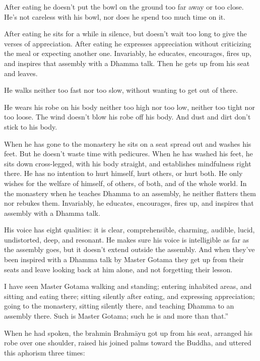 \documentclass[12pt,openany]{book}%
\begin{document}
After eating he doesn’t put the bowl on the ground too far away or too close. He’s not careless with his bowl, nor does he spend too much time on it. 

After eating he sits for a while in silence, but doesn’t wait too long to give the verses of appreciation. After eating he expresses appreciation without criticizing the meal or expecting another one. Invariably, he educates, encourages, fires up, and inspires that assembly with a Dhamma talk. Then he gets up from his seat and leaves. 

He walks neither too fast nor too slow, without wanting to get out of there. 

He wears his robe on his body neither too high nor too low, neither too tight nor too loose. The wind doesn’t blow his robe off his body. And dust and dirt don’t stick to his body. 

When he has gone to the monastery he sits on a seat spread out and washes his feet. But he doesn’t waste time with pedicures. When he has washed his feet, he sits down cross-legged, with his body straight, and establishes mindfulness right there. He has no intention to hurt himself, hurt others, or hurt both. He only wishes for the welfare of himself, of others, of both, and of the whole world. In the monastery when he teaches Dhamma to an assembly, he neither flatters them nor rebukes them. Invariably, he educates, encourages, fires up, and inspires that assembly with a Dhamma talk. 

His voice has eight qualities: it is clear, comprehensible, charming, audible, lucid, undistorted, deep, and resonant. He makes sure his voice is intelligible as far as the assembly goes, but it doesn’t extend outside the assembly. And when they’ve been inspired with a Dhamma talk by Master Gotama they get up from their seats and leave looking back at him alone, and not forgetting their lesson. 

I have seen Master Gotama walking and standing; entering inhabited areas, and sitting and eating there; sitting silently after eating, and expressing appreciation; going to the monastery, sitting silently there, and teaching Dhamma to an assembly there. Such is Master Gotama; such he is and more than that.” 

When he had spoken, the brahmin \textsanskrit{Brahmāyu} got up from his seat, arranged his robe over one shoulder, raised his joined palms toward the Buddha, and uttered this aphorism three times: 
\end{document}
